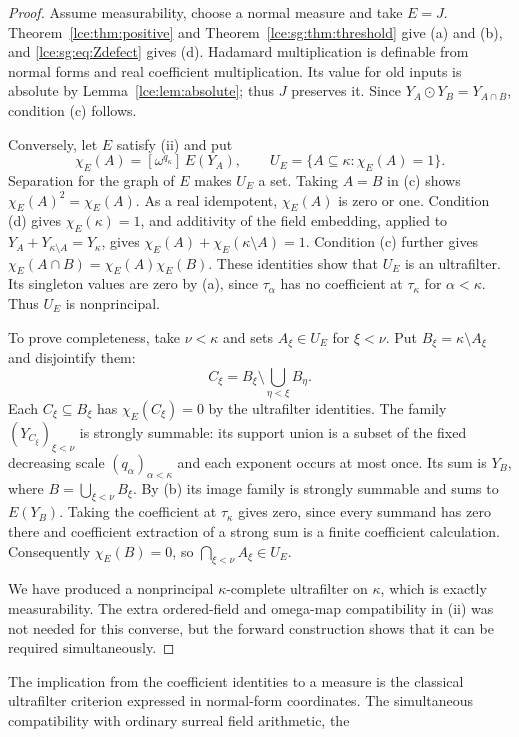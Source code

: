 \documentclass[11pt,letterpaper]{article}
\numberwithin{equation}{section}
\theoremstyle{definition}
\theoremstyle{remark}
\newcommand{\coef}[2]{[\omega^{#1}]\,#2}
\newcommand{\thref}[1]{Theorem~\ref{#1}}
\newcommand{\leref}[1]{Lemma~\ref{#1}}
\begin{document}
\begin{proof}
Assume measurability, choose a normal measure and take $E=J$.
\thref{lce:thm:positive} and \thref{lce:sg:thm:threshold} give (a) and (b),
and \eqref{lce:sg:eq:Zdefect} gives (d). Hadamard multiplication is
definable from normal forms and real coefficient multiplication. Its value
for old inputs is absolute by \leref{lce:lem:absolute}; thus $J$ preserves
it. Since $Y_A\odot Y_B=Y_{A\cap B}$, condition (c) follows.

Conversely, let $E$ satisfy (ii) and put
\[
 \chi_E(A)=\coef{q_\kappa}{E(Y_A)},\qquad
 U_E=\{A\subseteq\kappa:\chi_E(A)=1\}.
\]
Separation for the graph of $E$ makes $U_E$ a set. Taking $A=B$ in (c)
shows $\chi_E(A)^2=\chi_E(A)$. As a real idempotent, $\chi_E(A)$ is zero or
one. Condition (d) gives $\chi_E(\kappa)=1$, and additivity of the field
embedding, applied to $Y_A+Y_{\kappa\setminus A}=Y_\kappa$, gives
$\chi_E(A)+\chi_E(\kappa\setminus A)=1$. Condition (c) further gives
$\chi_E(A\cap B)=\chi_E(A)\chi_E(B)$. These identities show that $U_E$ is an
ultrafilter. Its singleton values are zero by (a), since $\tau_\alpha$ has no
coefficient at $\tau_\kappa$ for $\alpha<\kappa$. Thus $U_E$ is nonprincipal.

To prove completeness, take $\nu<\kappa$ and sets $A_\xi\in U_E$ for
$\xi<\nu$. Put $B_\xi=\kappa\setminus A_\xi$ and disjointify them:
\[
 C_\xi=B_\xi\setminus\bigcup_{\eta<\xi}B_\eta.
\]
Each $C_\xi\subseteq B_\xi$ has $\chi_E(C_\xi)=0$ by the ultrafilter
identities. The family $(Y_{C_\xi})_{\xi<\nu}$ is strongly summable: its
support union is a subset of the fixed decreasing scale
$(q_\alpha)_{\alpha<\kappa}$ and each exponent occurs at most once. Its sum
is $Y_B$, where $B=\bigcup_{\xi<\nu}B_\xi$. By (b) its image family is
strongly summable and sums to $E(Y_B)$. Taking the coefficient at
$\tau_\kappa$ gives zero, since every summand has zero there and coefficient
extraction of a strong sum is a finite coefficient calculation.
Consequently $\chi_E(B)=0$, so $\bigcap_{\xi<\nu}A_\xi\in U_E$.

We have produced a nonprincipal $\kappa$-complete ultrafilter on $\kappa$,
which is exactly measurability. The extra ordered-field and omega-map
compatibility in (ii) was not needed for this converse, but the forward
construction shows that it can be required simultaneously.
\end{proof}
The implication from the coefficient identities to a measure is the
classical ultrafilter criterion expressed in normal-form coordinates. The
simultaneous compatibility with ordinary surreal field arithmetic, the
\end{document}
